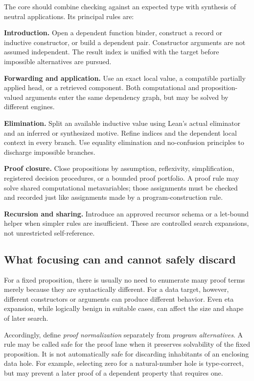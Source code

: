 \documentclass[11pt,letterpaper]{article}
\theoremstyle{definition}
\theoremstyle{remark}
\begin{document}
The core should combine checking against an expected type with synthesis of neutral applications. Its principal rules are:

\textbf{Introduction.} Open a dependent function binder, construct a record or inductive constructor, or build a dependent pair. Constructor arguments are not assumed independent. The result index is unified with the target before impossible alternatives are pursued.

\textbf{Forwarding and application.} Use an exact local value, a compatible partially applied head, or a retrieved component. Both computational and proposition-valued arguments enter the same dependency graph, but may be solved by different engines.

\textbf{Elimination.} Split an available inductive value using Lean's actual eliminator and an inferred or synthesized motive. Refine indices and the dependent local context in every branch. Use equality elimination and no-confusion principles to discharge impossible branches.

\textbf{Proof closure.} Close propositions by assumption, reflexivity, simplification, registered decision procedures, or a bounded proof portfolio. A proof rule may solve shared computational metavariables; those assignments must be checked and recorded just like assignments made by a program-construction rule.

\textbf{Recursion and sharing.} Introduce an approved recursor schema or a let-bound helper when simpler rules are insufficient. These are controlled search expansions, not unrestricted self-reference.

\subsection{What focusing can and cannot safely discard}

For a fixed proposition, there is usually no need to enumerate many proof terms merely because they are syntactically different. For a data target, however, different constructors or arguments can produce different behavior. Even eta expansion, while logically benign in suitable cases, can affect the size and shape of later search.

Accordingly, define \emph{proof normalization} separately from \emph{program alternatives}. A rule may be called safe for the proof lane when it preserves solvability of the fixed proposition. It is not automatically safe for discarding inhabitants of an enclosing data hole. For example, selecting zero for a natural-number hole is type-correct, but may prevent a later proof of a dependent property that requires one.
\end{document}
